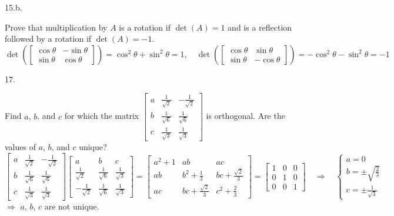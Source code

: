 \documentclass[12pt]{book}
\begin{document}
\begin{CJK}{UTF8}{bsmi}
15.b. \begin{minipage}[t]{\dimexpr\linewidth-2em}
Prove that multiplication by $A$ is a rotation if $\det(A)=1$ and is a reflection followed by a rotation if $\det(A)=-1$. \\
$\det\left(\begin{bmatrix}
\cos\theta & -\sin\theta \\
\sin\theta & \cos\theta
\end{bmatrix}\right)=\cos^2\theta+\sin^2\theta=1,\quad\det\left(\begin{bmatrix}
\cos\theta & \sin\theta \\
\sin\theta & -\cos\theta
\end{bmatrix}\right)=-\cos^2\theta-\sin^2\theta=-1$
\end{minipage}

17. \begin{minipage}[t]{\dimexpr\linewidth-2em}
Find $a$, $b$, and $c$ for which the matrix $\begin{bmatrix}
a & \frac{1}{\sqrt{2}} & -\frac{1}{\sqrt{2}} \\
b & \frac{1}{\sqrt{6}} & \frac{1}{\sqrt{6}} \\
c & \frac{1}{\sqrt{3}} & \frac{1}{\sqrt{3}}
\end{bmatrix}$ is orthogonal. Are the values of $a$, $b$, and $c$ unique? \\
$\begin{bmatrix}
a & \frac{1}{\sqrt{2}} & -\frac{1}{\sqrt{2}} \\
b & \frac{1}{\sqrt{6}} & \frac{1}{\sqrt{6}} \\
c & \frac{1}{\sqrt{3}} & \frac{1}{\sqrt{3}}
\end{bmatrix}\begin{bmatrix}
a & b & c \\
\frac{1}{\sqrt{2}} & \frac{1}{\sqrt{6}} & \frac{1}{\sqrt{3}} \\
-\frac{1}{\sqrt{2}} & \frac{1}{\sqrt{6}} & \frac{1}{\sqrt{3}}
\end{bmatrix}=\begin{bmatrix}
a^2+1 & ab & ac \\
ab & b^2+\frac{1}{3} & bc+\frac{\sqrt{2}}{3} \\
ac & bc+\frac{\sqrt{2}}{3} & c^2+\frac{2}{3}
\end{bmatrix}=\begin{bmatrix}
1 & 0 & 0 \\
0 & 1 & 0 \\
0 & 0 & 1
\end{bmatrix}\quad\Rightarrow\quad\left\{\begin{matrix}
a = 0 \\
b = \pm\sqrt{\frac{2}{3}} \\
c = \pm\frac{1}{\sqrt{3}}
\end{matrix}\right.$ \\
$\Rightarrow$ $a$, $b$, $c$ are not unique.
\end{minipage}


\end{CJK}
\end{document}
